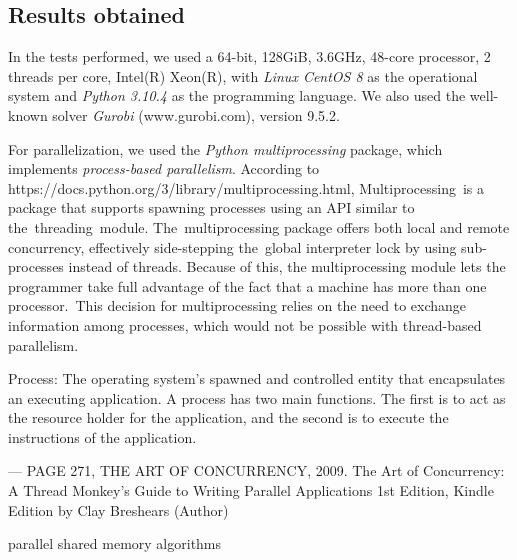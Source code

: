 \documentclass[preprint,authoryear]{elsarticle}
\begin{document}
\subsection{Results obtained}

In the tests performed, we used a 64-bit, 128GiB, 3.6GHz, 48-core processor, 2 threads per core, Intel(R) Xeon(R), with {\it Linux CentOS 8} as the operational system and {\it Python 3.10.4}\/ as the programming language. We also used the well-known solver {\it Gurobi}\/ (www.gurobi.com), version 9.5.2.

For parallelization, we used the {\it Python multiprocessing} package, which implements {\it process-based parallelism}. According to https://docs.python.org/3/library/multiprocessing.html, Multiprocessing is a package that supports spawning processes using an API similar to the threading module. The multiprocessing package offers both local and remote concurrency, effectively side-stepping the global interpreter lock by using sub-processes instead of threads. Because of this, the multiprocessing module lets the programmer take full advantage of the fact that a machine has more than one processor. This decision for multiprocessing relies on the need to exchange information among processes, which would not be possible with thread-based parallelism.

Process: The operating system’s spawned and controlled entity that encapsulates an executing application. A process has two main functions. The first is to act as the resource holder for the application, and the second is to execute the instructions of the application.

— PAGE 271, THE ART OF CONCURRENCY, 2009. The Art of Concurrency: A Thread Monkey's Guide to Writing Parallel Applications 1st Edition, Kindle Edition by Clay Breshears  (Author) 

parallel shared memory algorithms

\vspace{2.0mm}
\end{document}

